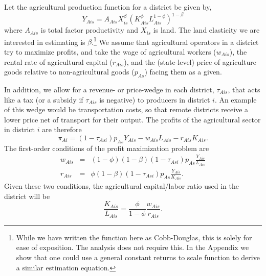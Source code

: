 \documentclass[11pt]{article}
\begin{document}
Let the agricultural production function for a district be given by,
\begin{equation}
Y_{Ais} = A_{Ais} X_{is}^{\beta} \left(K_{Ais}^{\phi}L_{Ais}^{1-\phi}\right)^{1-\beta} \label{EQ_production}
\end{equation}
where $A_{Ais}$ is total factor productivity and $X_{is}$ is land. The land elasticity we are interested in estimating is $\beta$.\footnote{While we have written the function here as Cobb-Douglas, this is solely for ease of exposition. The analysis does not require this. In the Appendix we show that one could use a general constant returns to scale function to derive a similar estimation equation.} We assume that agricultural operators in a district try to maximize profits, and take the wage of agricultural workers ($w_{Ais}$), the rental rate of agricultural capital ($r_{Ais}$), and the (state-level) price of agriculture goods relative to non-agricultural goods ($p_{As}$) facing them as a given.

In addition, we allow for a revenue- or price-wedge in each district, $\tau_{Ais}$, that acts like a tax (or a subsidy if $\tau_{Ais}$ is negative) to producers in district $i$. An example of this wedge would be transportation costs, so that remote districts receive a lower price net of transport for their output. The profits of the agricultural sector in district $i$ are therefore
\begin{equation}
	\pi_{Ai} = (1-\tau_{Asi}) p_{As} Y_{Ais} - w_{Ais} L_{Ais} - r_{Ais} K_{Ais}.
\end{equation}
The first-order conditions of the profit maximization problem are
\begin{eqnarray}
    w_{Ais} &=& (1-\phi)(1-\beta) (1-\tau_{Asi}) p_{As} \frac{Y_{Ais}}{L_{Ais}} \\ \nonumber 
    r_{Ais} &=& \phi(1-\beta) (1-\tau_{Asi}) p_{As} \frac{Y_{Ais}}{K_{Ais}}. \label{EQ_factorprices}
\end{eqnarray}
Given these two conditions, the agricultural capital/labor ratio used in the district will be
\begin{equation}
	\frac{K_{Ais}}{L_{Ais}} = \frac{\phi}{1-\phi} \frac{w_{Ais}}{r_{Ais}}. \label{EQ_KLag}
\end{equation}
\end{document}
